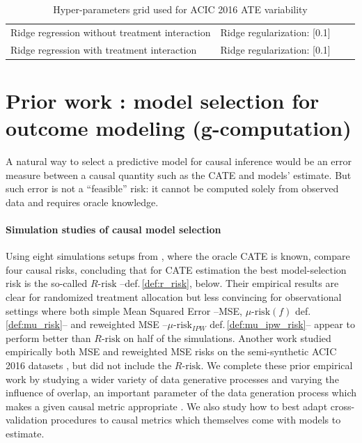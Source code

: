 \documentclass[11pt]{article}
\let\cite=\supercite
\begin{document}
\begin{appendices}
\begin{table}[h!]
\begin{tabular}{llll}
            Ridge regression without treatment interaction & Ridge regularization:
            [0.1]                                                                  \\

            Ridge regression with treatment interaction    & Ridge regularization:
            [0.1]                                                                  \\
            \bottomrule
        \end{tabular}
        \caption{Hyper-parameters grid used for ACIC 2016 ATE variability}
        \label{apd:toy_example:acic_2016_ate_variability:table}
    \end{table}

    \section{Prior work : model selection for outcome modeling (g-computation)}\label{apd:prior_work}

    A natural way to select a predictive model for causal inference would be
    an error measure between a causal quantity such as the CATE and models' estimate. But such error is
    not a ``feasible'' risk: it cannot be computed solely from observed data
    and requires oracle knowledge.


    \paragraph{Simulation studies of causal model selection}

    Using eight simulations setups from \cite{powers_methods_2018}, where
    the oracle CATE is known, \citet{schuler_comparison_2018} compare four
    causal risks, concluding that for CATE estimation the best
    model-selection risk is the so-called $R\text{-risk}$
    \cite{nie_quasioracle_2017} --def.\,\ref{def:r_risk}, below. Their
    empirical results are clear for randomized treatment allocation but less
    convincing for observational settings where both simple Mean Squared
    Error --MSE, $\mu\text{-risk}(f)$ def.\,\ref{def:mu_risk}-- and
    reweighted MSE --$\mu\text{-risk}_{IPW}$ def.\,\ref{def:mu_ipw_risk}--
    appear to perform better than $R\text{-risk}$ on half of the simulations.
    Another work \cite{alaa_validating_2019} studied empirically both MSE and
    reweighted MSE risks on the semi-synthetic ACIC 2016 datasets
    \cite{dorie_automated_2019}, but did not include the $R\text{-risk}$. We complete these
    prior empirical work by studying a wider variety of data generative
    processes and varying the influence of overlap, an important parameter of
    the data generation process which makes a given causal metric appropriate
    \cite{damour_overlap_2020}. We also study how to best adapt
    cross-validation procedures to causal metrics which themselves come with
    models to estimate.


\end{appendices}
\end{document}
